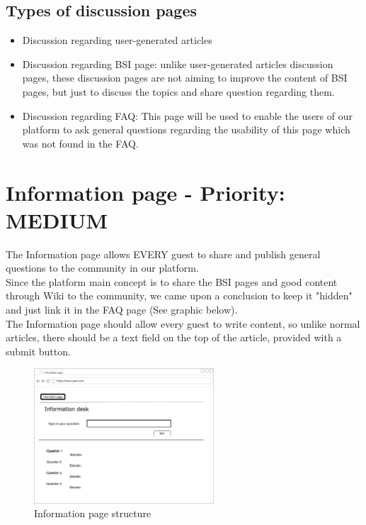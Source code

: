 \subsection{Types of discussion pages}
\begin{itemize}
\item Discussion regarding user-generated articles
\item Discussion regarding BSI page: unlike user-generated articles discussion pages, these discussion pages are not aiming to improve the content of BSI pages, but just to discuss the topics and share question regarding them.
\item Discussion regarding FAQ: This page will be used to enable the users of our platform to ask general questions regarding the usability of this page which was not found in the FAQ.
 
 \end{itemize}
 
\section{Information page - Priority: MEDIUM}
 The Information page allows EVERY guest to share and publish general questions to the community in our platform.\\
 Since the platform main concept is to share the BSI pages and good content through Wiki to the community, we came upon a conclusion to keep it "hidden" and just link it in the FAQ page (See graphic below). \\


The Information page should allow every guest to write content, so unlike normal articles, there should be a text field on the top of the article, provided with a submit button.

\begin{figure}[h] 
    \centering
    \includegraphics[width=0.6\textwidth]{Pictures/information2.jpg}
    \caption{Information page structure}
\end{figure} 

